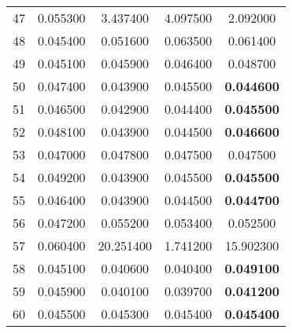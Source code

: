 \begin{longtable}{c|c|ccc}
47  &   0.055300  &   3.437400  &   4.097500   &   2.092000  \\
48  &   0.045400  &   0.051600  &   0.063500   &   0.061400  \\
49  &   0.045100  &   0.045900  &   0.046400   &   0.048700  \\
50  &   0.047400  &   0.043900  &   0.045500   &   \textbf{0.044600}  \\ \hline
51  &   0.046500  &   0.042900  &   0.044400   &   \textbf{0.045500}  \\
52  &   0.048100  &   0.043900  &   0.044500   &   \textbf{0.046600}  \\
53  &   0.047000  &   0.047800  &   0.047500   &   0.047500  \\
54  &   0.049200  &   0.043900  &   0.045500   &   \textbf{0.045500}  \\
55  &   0.046400  &   0.043900  &   0.044500   &   \textbf{0.044700}  \\
56  &   0.047200  &   0.055200  &   0.053400   &   0.052500  \\
57  &   0.060400  &  20.251400  &   1.741200   &  15.902300  \\
58  &   0.045100  &   0.040600  &   0.040400   &   \textbf{0.049100}  \\
59  &   0.045900  &   0.040100  &   0.039700   &   \textbf{0.041200}  \\
60  &   0.045500  &   0.045300  &   0.045400   &   \textbf{0.045400}  \\

 \hline
\end{longtable}
